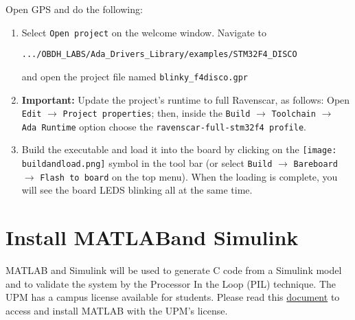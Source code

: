 Open GPS and do the following:
\begin{enumerate}
	\item Select \texttt{Open project} on the welcome window. Navigate to
	\begin{center}
		\begin{BVerbatim}
.../OBDH_LABS/Ada_Drivers_Library/examples/STM32F4_DISCO
		\end{BVerbatim}
	\end{center}
	
	and open the project file named \texttt{blinky\_f4disco.gpr}
	
	\item   \textbf{\textcolor{mRedBrown}{Important:}} Update the project's runtime to full Ravenscar, as follows: Open {\tt Edit} $\rightarrow$ {\tt Project properties}; then, inside the {\tt Build} $\rightarrow$ {\tt Toolchain} $\rightarrow$ {\tt Ada Runtime} option choose the \texttt{ravenscar-full-stm32f4 profile}.
	
	\item	Build the executable and load it into the board by clicking on the \hbox{\texttt{[image: buildandload.png]}} symbol in the tool bar (or select {\tt Build} $\rightarrow$ {\tt Bareboard} $\rightarrow$ {\tt Flash to board} on the top menu). When the loading is complete, you will see the board LEDS blinking all at the same time.
\end{enumerate}

\section{Install MATLAB\texttrademark and Simulink\texttrademark}

MATLAB and Simulink will be used to generate C code from a Simulink model and 
to validate the system by the Processor In the Loop (PIL) technique. The UPM has a campus license available for students.
Please read this \href{https://www.upm.es/sfs/Rectorado/Vicerrectorado\%20de\%20Tecnologias\%20de\%20la\%20Informacion\%20y\%20Servicios\%20en\%20Red/Servicio\%20de\%20Planificacion\%20Informatica\%20y\%20Comunicaciones/SW/MATLAB\_UPM\_Estudiantes.pdf}{document} to access and install MATLAB with the UPM's license.

